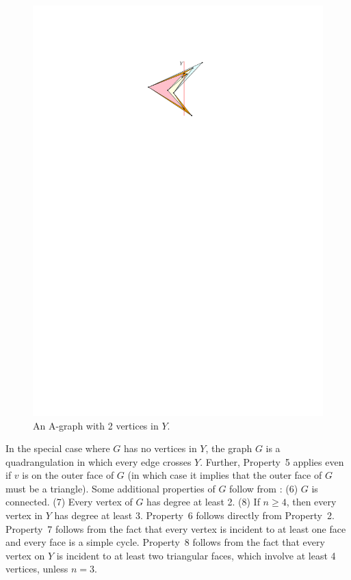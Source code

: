 \begin{figure}
		\Vspace{-1mm}
		\centering
		\includegraphics[scale = 0.95]{figs/a-graph-new}
		\caption{An A-graph with 2 vertices in $Y$.}
	\end{figure}
	
In the special case where $G$ has no vertices in $Y$, the graph $G$ is a quadrangulation in which every edge crosses $Y$. Further, Property~5 applies even if $v$ is on the outer face of $G$ (in which case it implies that the outer face of $G$ must be a triangle).
Some additional properties of $G$ follow from : (6) $G$ is connected. (7) Every vertex of $G$ has degree at least 2. (8) If $n\ge 4$, then every vertex in $Y$ has degree at least 3.  Property~6 follows directly from Property~2.
Property~7 follows from the fact that every vertex is incident to at
least one face and every face is a simple cycle.
Property~8 follows from the fact that every vertex on $Y$ is incident
to at least two triangular faces, which involve at least 4 vertices, unless $n=3$.

